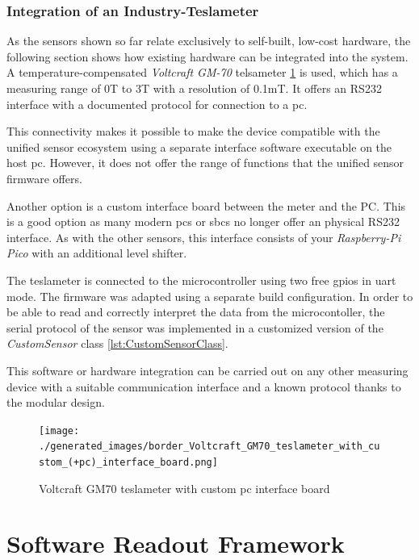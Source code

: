\hypertarget{integration-of-an-industry-teslameter}{%
\subsection{Integration of an
Industry-Teslameter}\label{integration-of-an-industry-teslameter}}

As the sensors shown so far relate exclusively to self-built, low-cost
hardware, the following section shows how existing hardware can be
integrated into the system. A temperature-compensated \emph{Voltcraft
GM-70} telsameter
\ref{Voltcraft_GM70_teslameter_with_custom_(+pc)_interface_board.png} is
used, which has a measuring range of 0T to 3T with a resolution of
0.1mT. It offers an RS232 interface with a documented protocol for
connection to a \gls{pc}.

This connectivity makes it possible to make the device compatible with
the unified sensor ecosystem using a separate interface software
\cite{VoltcraftGM70Rest} executable on the host \gls{pc}. However,
it does not offer the range of functions that the unified sensor
firmware offers.

Another option is a custom interface board between the meter and the PC.
This is a good option as many modern \gls{pc}s or \gls{sbc}s no longer
offer an physical RS232 interface. As with the other sensors, this
interface consists of your \emph{Raspberry-Pi Pico} with an additional
level shifter.

The teslameter is connected to the microcontroller using two free
\gls{gpio}s in \gls{uart} mode. The firmware was adapted using a
separate build configuration. In order to be able to read and correctly
interpret the data from the microcontoller, the serial protocol of the
sensor was implemented in a customized version of the
\emph{CustomSensor} class \ref{lst:CustomSensorClass}.

This software or hardware integration can be carried out on any other
measuring device with a suitable communication interface and a known
protocol thanks to the modular design.

\begin{figure}
\centering
\texttt{[image: ./generated\_images/border\_Voltcraft\_GM70\_teslameter\_with\_custom\_(+pc)\_interface\_board.png]}
\caption{Voltcraft GM70 teslameter with custom \gls{pc} interface board
\label{Voltcraft_GM70_teslameter_with_custom_(+pc)_interface_board.png}}
\end{figure}

\hypertarget{software-readout-framework}{%
\chapter{Software Readout Framework}\label{software-readout-framework}}

